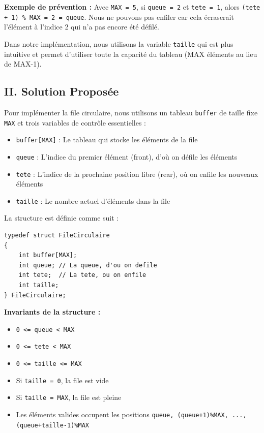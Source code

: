 \documentclass[a4paper, 11pt]{article}
\begin{document}
\textbf{Exemple de prévention :} Avec \texttt{MAX = 5}, si \texttt{queue = 2} et \texttt{tete = 1}, alors \texttt{(tete + 1) \% MAX = 2 = queue}. Nous ne pouvons pas enfiler car cela écraserait l'élément à l'indice 2 qui n'a pas encore été défilé.

Dans notre implémentation, nous utilisons la variable \texttt{taille} qui est plus intuitive et permet d'utiliser toute la capacité du tableau (MAX éléments au lieu de MAX-1).

\subsection{II. Solution Proposée}

Pour implémenter la file circulaire, nous utilisons un tableau \texttt{buffer} de taille fixe \texttt{MAX} et trois variables de contrôle essentielles :

\begin{itemize}
    \item \texttt{buffer[MAX]} : Le tableau qui stocke les éléments de la file
    \item \texttt{queue} : L'indice du premier élément (front), d'où on défile les éléments
    \item \texttt{tete} : L'indice de la prochaine position libre (rear), où on enfile les nouveaux éléments
    \item \texttt{taille} : Le nombre actuel d'éléments dans la file
\end{itemize}

La structure est définie comme suit :
\begin{lstlisting}
typedef struct FileCirculaire
{
    int buffer[MAX];
    int queue; // La queue, d'ou on defile
    int tete;  // La tete, ou on enfile
    int taille;
} FileCirculaire;
\end{lstlisting}

\textbf{Invariants de la structure :}
\begin{itemize}
    \item \texttt{0 <= queue < MAX}
    \item \texttt{0 <= tete < MAX}
    \item \texttt{0 <= taille <= MAX}
    \item Si \texttt{taille = 0}, la file est vide
    \item Si \texttt{taille = MAX}, la file est pleine
    \item Les éléments valides occupent les positions \texttt{queue, (queue+1)\%MAX, ..., (queue+taille-1)\%MAX}
\end{itemize}
\end{document}
